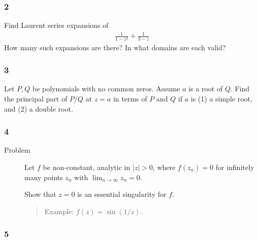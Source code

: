 \hypertarget{section-69}{%
\subsubsection{2}\label{section-69}}

\begin{description}
\tightlist
\item[Problem]
Find Laurent series expansions of
\begin{align*}
  \frac{1}{1-z^2} + \frac{1}{3-z}
  \end{align*}
How many such expansions are there? In what domains are each valid?
\end{description}

\hypertarget{section-70}{%
\subsubsection{3}\label{section-70}}

\begin{description}
\tightlist
\item[Problem]
Let \(P, Q\) be polynomials with no common zeros. Assume \(a\) is a root
of \(Q\). Find the principal part of \(P/Q\) at \(z=a\) in terms of
\(P\) and \(Q\) if \(a\) is (1) a simple root, and (2) a double root.
\end{description}

\hypertarget{section-71}{%
\subsubsection{4}\label{section-71}}

\begin{description}
\item[Problem]
Let \(f\) be non-constant, analytic in
\({\left\lvert {z} \right\rvert} > 0\), where \(f(z_n) = 0\) for
infinitely many points \(z_n\) with \(\lim_{n\to\infty} z_n = 0\).

Show that \(z=0\) is an essential singularity for \(f\).

\begin{quote}
Example: \(f(z) = \sin(1/z)\).
\end{quote}
\end{description}

\hypertarget{section-72}{%
\subsubsection{5}\label{section-72}}

